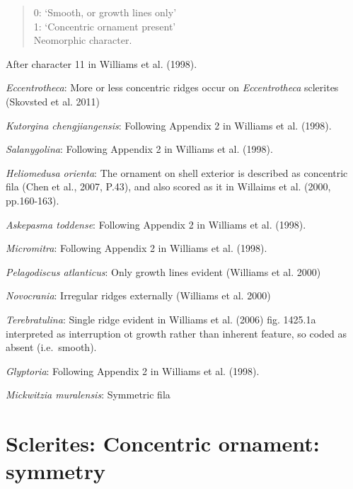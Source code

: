 \documentclass[]{book}
\theoremstyle{definition}
\theoremstyle{definition}
\theoremstyle{definition}
\theoremstyle{remark}
\begin{document}
\begin{quote}
0: `Smooth, or growth lines only'\\
1: `Concentric ornament present'\\
Neomorphic character.
\end{quote}

After character 11 in Williams et al. (1998).

\emph{Eccentrotheca}: More or less concentric ridges occur on
\emph{Eccentrotheca} sclerites (Skovsted et al. 2011)

\emph{Kutorgina chengjiangensis}: Following Appendix 2 in Williams et
al. (1998).

\emph{Salanygolina}: Following Appendix 2 in Williams et al. (1998).

\emph{Heliomedusa orienta}: The ornament on shell exterior is described
as concentric fila (Chen et al., 2007, P.43), and also scored as it in
Willaims et al. (2000, pp.160-163).

\emph{Askepasma toddense}: Following Appendix 2 in Williams et al.
(1998).

\emph{Micromitra}: Following Appendix 2 in Williams et al. (1998).

\emph{Pelagodiscus atlanticus}: Only growth lines evident (Williams et
al. 2000)

\emph{Novocrania}: Irregular ridges externally (Williams et al. 2000)

\emph{Terebratulina}: Single ridge evident in Williams et al. (2006)
fig. 1425.1a interpreted as interruption ot growth rather than inherent
feature, so coded as absent (i.e.~smooth).

\emph{Glyptoria}: Following Appendix 2 in Williams et al. (1998).

\emph{Mickwitzia muralensis}: Symmetric fila

\hypertarget{sclerites-concentric-ornament-symmetry}{%
\section*{Sclerites: Concentric ornament:
symmetry}\label{sclerites-concentric-ornament-symmetry}}
\end{document}
